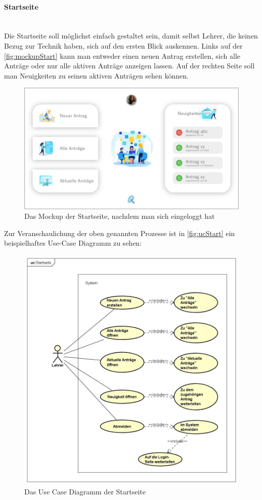 \paragraph{Startseite}
~\\
Die Startseite soll möglichst einfach gestaltet sein, damit selbst Lehrer, die keinen Bezug zur Technik haben, sich auf den ersten Blick auskennen. Links auf der \autoref{fig:mockupStart} kann man entweder einen neuen Antrag erstellen, sich alle Anträge oder nur alle aktiven Anträge anzeigen lassen. Auf der rechten Seite soll man Neuigkeiten zu seinen aktiven Anträgen sehen können.
\begin{figure}[H]
	\centering
	\includegraphics[width=1\linewidth]{images/Mockup-Startseite-eingeloggt}
	\caption[Mockup Startseite]{Das Mockup der Startseite, nachdem man sich eingeloggt hat}
	\label{fig:mockupStart}
\end{figure}
Zur Veranschaulichung der oben genannten Prozesse ist in \autoref{fig:ucStart} ein beispielhaftes Use-Case Diagramm zu sehen: 
\begin{figure}[H]
	\centering
	\includegraphics[width=1\linewidth]{images/uc-start}
	\caption[Use Case Diagramm Login]{Das Use Case Diagramm der Startseite}
	\label{fig:ucStart}
\end{figure}
